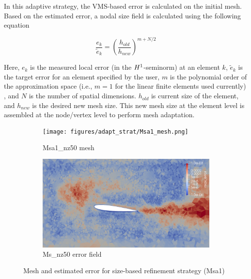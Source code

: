 In this adaptive strategy, the VMS-based error is calculated on the initial mesh. Based on the estimated error, a nodal size field is calculated using the following equation \cite{zhang19}

\begin{equation}
\frac{e_k}{\tilde{e}_k} = \left(\frac{h_{old}}{h_{new}}\right)^{m+N/2} 
\label{eq:diez}
\end{equation}

Here, $e_k$ is the measured local error (in the $H^{1}$-seminorm) at an element $k$, $\tilde{e}_k$ is the target error for an element specified by the user, $m$ is the polynomial order of the approximation space (i.e., $m=1$ for the linear finite elements used currently) , and $N$ is the number of spatial dimensions. $h_{old}$ is current size of the element, and $h_{new}$ is the desired new mesh size.
This new mesh size at the element level is assembled at the node/vertex level to perform mesh adaptation.

\begin{figure}[H]
\centering

\begin{subfigure}[b]{0.475\textwidth}
\centering
\texttt{[image: figures/adapt\_strat/Msa1\_mesh.png]}
\caption{Msa1\_nz50 mesh}
\label{fig:h_adapt1_mesh}
\end{subfigure}
\begin{subfigure}[b]{0.475\textwidth}
\centering
\includegraphics[width=1\textwidth]{figures/adapt_strat/Msa1_error.png}
\caption{Ms\_nz50 error field}
\label{fig:h_adapt1_error_plot}
\end{subfigure}

\caption{Mesh and estimated error for size-based refinement strategy (Msa1)}
\end{figure}

